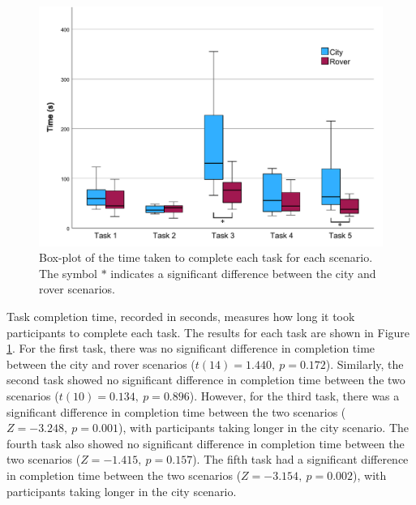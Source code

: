 
            \begin{figure}[h!]
                \centering
                \includegraphics[width=1\linewidth]{figures/task_time_graph.pdf}
                \caption{Box-plot of the time taken to complete each task for each scenario. The symbol $\ast$ indicates a significant difference between the city and rover scenarios.}
                \label{fig:task_time}
            \end{figure}

            Task completion time, recorded in seconds, measures how long it took participants to complete each task. The results for each task are shown in Figure \ref{fig:task_time}. For the first task, there was no significant difference in completion time between the city and rover scenarios ($t(14) = 1.440,\ p = 0.172$). Similarly, the second task showed no significant difference in completion time between the two scenarios ($t(10) = 0.134,\ p = 0.896$). However, for the third task, there was a significant difference in completion time between the two scenarios ($Z = -3.248,\ p = 0.001$), with participants taking longer in the city scenario. The fourth task also showed no significant difference in completion time between the two scenarios ($Z = -1.415,\ p = 0.157$). The fifth task had a significant difference in completion time between the two scenarios ($Z = -3.154,\ p = 0.002$), with participants taking longer in the city scenario.


